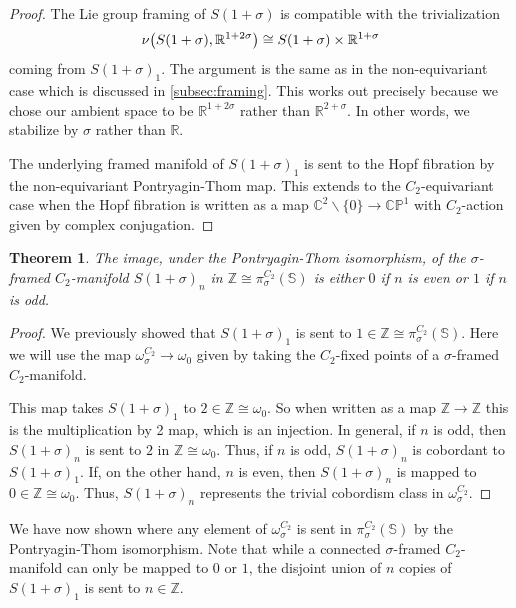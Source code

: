 \documentclass[11pt]{amsart}
\newcommand{\R}{\mathbb R}
\newcommand{\C}{\mathbb C}
\newcommand{\Z}{\mathbb{Z}}
\newcommand{\Sph}{\mathbb{S}}
\theoremstyle{plain}   %
\newtheorem{thm}{Theorem}[section] %
\theoremstyle{definition}
\theoremstyle{remark}
\numberwithin{equation}{section}
\let\originalleft\left
\let\originalright\right
\renewcommand{\left}{\mathopen{}\mathclose\bgroup\originalleft}
\renewcommand{\right}{\aftergroup\egroup\originalright}
\begin{document}
\begin{proof}
The Lie group framing of $S(1+\sigma)$ is compatible with the trivialization
\[
\nu\left(S(1+\sigma),\R^{1+2\sigma}\right)\cong S(1+\sigma)\times \R^{1+\sigma}
\]
coming from $S(1+\sigma)_1$. The argument is the same as in the non-equivariant case which is discussed in \cref{subsec:framing}.  This works out precisely because we chose our ambient space to be $\R^{1+2\sigma}$ rather than $\R^{2+\sigma}$. In other words, we stabilize by $\sigma$ rather than $\R$.  

The underlying framed manifold of $S(1+\sigma)_1$ is sent to the Hopf fibration by the non-equivariant Pontryagin-Thom map. This extends to the $C_2$-equivariant case when the Hopf fibration is written as a map $\C^2\backslash \{0\}\to \mathbb{CP}^1$ with $C_2$-action given by complex conjugation. 
\end{proof}

\begin{thm}
The image, under the Pontryagin-Thom isomorphism, of the $\sigma$-framed $C_2$-manifold $S(1+\sigma)_n$ in $\Z\cong \pi_\sigma^{C_2}(\Sph)$ is either $0$ if $n$ is even or $1$ if $n$ is odd.
\end{thm}

\begin{proof}
We previously showed that $S(1+\sigma)_1$ is sent to $1\in \Z\cong \pi_\sigma^{C_2}(\Sph)$. Here we will use the map $\omega_\sigma^{C_2}\to \omega_0$ given by taking the $C_2$-fixed points of a $\sigma$-framed $C_2$-manifold. 

This map takes $S(1+\sigma)_1$ to $2\in\Z\cong \omega_0$. So when written as a map $\Z\to \Z$ this is the multiplication by 2 map, which is an injection. In general, if $n$ is odd, then $S(1+\sigma)_n$ is sent to $2$ in $\Z\cong \omega_0$. Thus, if $n$ is odd, $S(1+\sigma)_n$ is cobordant to $S(1+\sigma)_1$. If, on the other hand, $n$ is even, then $S(1+\sigma)_n$ is mapped to $0\in\Z\cong \omega_0$. Thus, $S(1+\sigma)_n$ represents the trivial cobordism class in $\omega_\sigma^{C_2}$. 
\end{proof}

We have now shown where any element of $\omega_\sigma^{C_2}$ is sent in $\pi_\sigma^{C_2}(\Sph)$ by the Pontryagin-Thom isomorphism. Note that while a connected $\sigma$-framed $C_2$-manifold can only be mapped to $0$ or $1$, the disjoint union of $n$ copies of $S(1+\sigma)_1$ is sent to $n\in \Z$.
\end{document}
